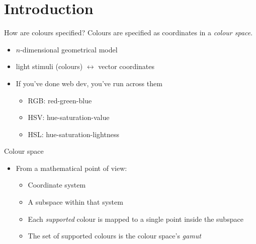 \documentclass[aspectratio=169,handout]{fireshonks}
\begin{document}
\section{Introduction}
\begin{frame}{How are colours specified?}
  Colours are specified as coordinates in a \emph{colour space}.
  \begin{itemize}[<+(1)->]
    \item $n$-dimensional geometrical model
    \item light stimuli (colours) $\leftrightarrow$ vector coordinates
    \item If you've done web dev, you've run across them
          \begin{itemize}
            \item RGB: red-green-blue
            \item HSV: hue-saturation-value
            \item HSL: hue-saturation-lightness
          \end{itemize}
  \end{itemize}
\end{frame}
\begin{frame}{Colour space}
  \begin{itemize}
    \item From a mathematical point of view:
          \begin{itemize}
            \item Coordinate system
            \item A subspace within that system
            \item Each \emph{supported} colour is mapped to a single point inside the subspace
            \item The set of supported colours is the colour space's \emph{gamut}
          \end{itemize}
  \end{itemize}
\end{frame}
\end{document}
